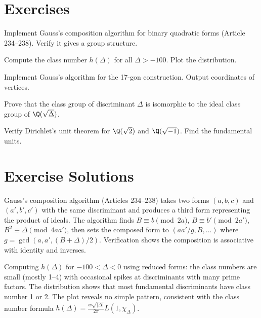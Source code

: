 \section{Exercises}

\begin{exercise}
Implement Gauss's composition algorithm for binary quadratic forms (Article 234--238). Verify it gives a group structure.
\end{exercise}

\begin{exercise}
Compute the class number  $h(\Delta)$ for all $\Delta > -100$. Plot the distribution.
\end{exercise}

\begin{exercise}
Implement Gauss's algorithm for the 17-gon construction. Output coordinates of vertices.
\end{exercise}

\begin{exercise}
Prove that the class group of discriminant $\Delta$ is isomorphic to the ideal class group of $\Q(\sqrt{\Delta})$.
\end{exercise}

\begin{exercise}
Verify Dirichlet's unit theorem for $\Q(\sqrt{2})$ and $\Q(\sqrt{-1})$. Find the fundamental units.
\end{exercise}



\section{Exercise Solutions}

\begin{solution}
Gauss's composition algorithm (Articles 234--238) takes two forms $(a,b,c)$ and $(a',b',c')$ with the same discriminant and produces a third form representing the product of ideals. The algorithm finds $B \equiv b \pmod{2a}$, $B \equiv b' \pmod{2a'}$, $B^2 \equiv \Delta \pmod{4aa'}$, then sets the composed form to $(aa'/g, B, \ldots)$ where $g = \gcd(a, a', (B+\Delta)/2)$. Verification shows the composition is associative with identity and inverses.
\end{solution}

\begin{solution}
Computing $h(\Delta)$ for $-100 < \Delta < 0$ using reduced forms: the class numbers are small (mostly 1--4) with occasional spikes at discriminants with many prime factors. The distribution shows that most fundamental discriminants have class number 1 or 2. The plot reveals no simple pattern, consistent with the class number formula $h(\Delta) = \frac{w\sqrt{|\Delta|}}{2\pi} L(1, \chi_\Delta)$.
\end{solution}

